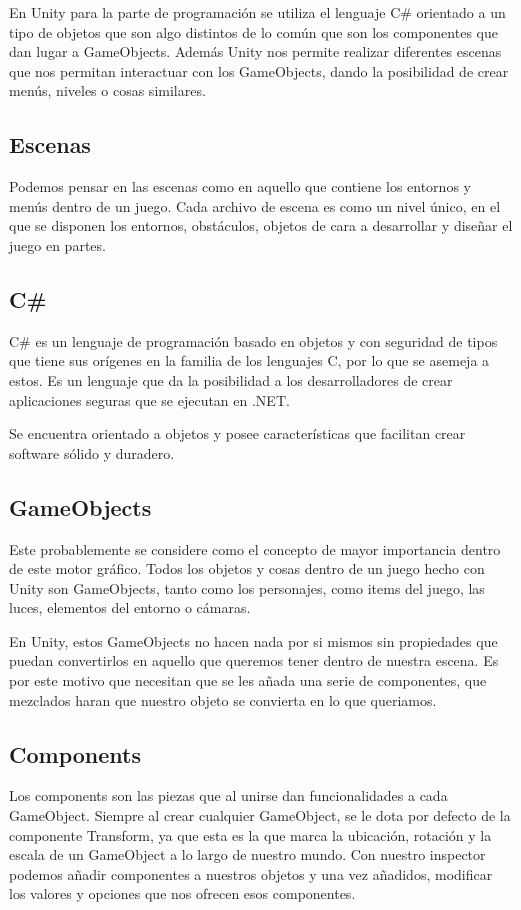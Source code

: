 En Unity para la parte de programación se utiliza el lenguaje C\# \cite{C}orientado a un tipo de objetos que son algo distintos de lo común que son los componentes que dan lugar a GameObjects.
Además Unity nos permite realizar diferentes escenas que nos permitan interactuar con los GameObjects, dando la posibilidad de crear menús, niveles o cosas similares.
\subsection{Escenas}
Podemos pensar en las escenas como en aquello que contiene los entornos y menús dentro de un juego. Cada archivo de escena es como un nivel único, en el que se disponen los entornos, obstáculos, objetos de cara a desarrollar y diseñar el juego en partes.

\subsection{C\#}
C\# \cite{C} es un lenguaje de programación basado en objetos y con seguridad de tipos que tiene sus orígenes en la familia de los lenguajes C, por lo que se asemeja a estos. Es un lenguaje que da la posibilidad a los desarrolladores de crear aplicaciones seguras que se ejecutan en .NET.

Se encuentra orientado a objetos y posee características que facilitan crear software sólido y duradero.

\subsection{GameObjects}
Este probablemente se considere como el concepto de mayor importancia dentro de este motor gráfico.
Todos los objetos y cosas dentro de un juego hecho con Unity son GameObjects\cite{GameObjects}, tanto como los personajes, como items del juego, las luces, elementos del entorno o cámaras.

En Unity, estos GameObjects no hacen nada por si mismos sin propiedades que puedan convertirlos en aquello que queremos tener dentro de nuestra escena. Es por este motivo que necesitan que se les añada una serie de componentes, que mezclados haran que nuestro objeto se convierta en lo que queriamos.

\subsection{Components}
Los components\cite{Componentes} son las piezas que al unirse dan funcionalidades a cada GameObject. 
Siempre al crear cualquier GameObject, se le dota por defecto de la componente Transform\cite{Transform}, ya que esta es la que marca la ubicación, rotación y la escala de un GameObject a lo largo de nuestro mundo. Con nuestro inspector podemos añadir componentes a nuestros objetos y una vez añadidos, modificar los valores y opciones que nos ofrecen esos componentes.

